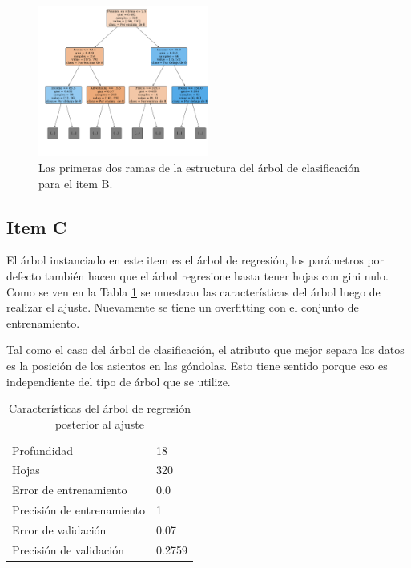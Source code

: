 \begin{figure}[H]
    \begin{small}
        \begin{center}
            \includegraphics[width=0.5\textwidth]{figures/tree_B_tree.pdf}
        \end{center}
        \caption{Las primeras dos ramas de la estructura del árbol de clasificación para el item B.}
        \label{fig:item_B_tree}
    \end{small}
\end{figure}


\subsection*{Item C}

El árbol instanciado en este item es el árbol de regresión, los parámetros por defecto también hacen que el árbol regresione hasta tener hojas con gini nulo. Como se ven en la Tabla \ref{tab:item_C} se muestran las características del árbol luego de realizar el ajuste. Nuevamente se tiene un overfitting con el conjunto de entrenamiento. 

Tal como el caso del árbol de clasificación, el atributo que mejor separa los datos es la posición de los asientos en las góndolas. Esto tiene sentido porque eso es independiente del tipo de árbol que se utilize.

\begin{table}[H]
    \begin{small}
        \begin{center}
            \begin{tabular}[c]{l|l}
                Profundidad & 18 \\
                Hojas & 320 \\
                Error de entrenamiento & 0.0\\
                Precisión de entrenamiento & 1 \\
                Error de validación & 0.07\\
                Precisión de validación & 0.2759 \\
            \end{tabular}
        \end{center}
    \end{small}
    \caption{Características del árbol de regresión posterior al ajuste}
    \label{tab:item_C}
\end{table}

